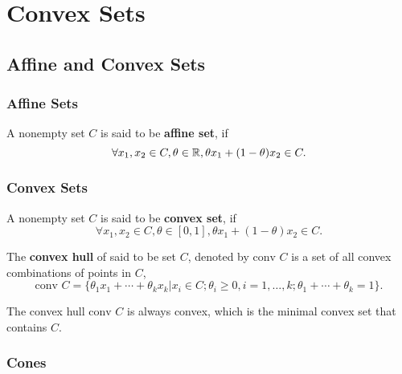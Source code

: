 \chapter{Convex Sets}

\section{Affine and Convex Sets}

\subsection{Affine Sets}
A nonempty set \(C\) is said to be \textbf{affine set}, if
\begin{equation*}
	\forall x_1,x_2\in C, \theta\in\mathbb{R}, \theta x_1+(1-\theta)x_2\in C.
\end{equation*}
\begin{definition}

\end{definition}

\subsection{Convex Sets}

\begin{definition}
	A nonempty set \(C\) is said to be \textbf{convex set}, if
	\begin{equation*}
		\forall x_1,x_2\in C,\theta\in[0,1], \theta x_1+(1-\theta)x_2\in C.
	\end{equation*}
\end{definition}

\begin{definition}
	The \textbf{convex hull} of said to be set \(C\), denoted by \(\text{conv } C\) is a set of all convex combinations of points in \(C\),
	\begin{equation*}
		\text{conv } C=\{\theta_1x_1+\cdots+\theta_{k}x_{k}|x_i\in C;\theta_i\geq 0,i=1,\ldots,k;\theta_1+\cdots+\theta_k=1\}.
	\end{equation*}
\end{definition}

\begin{remark}
	The convex hull \(\text{conv } C\) is always convex, which is the minimal convex set that contains \(C\).
\end{remark}

\subsection{Cones}

